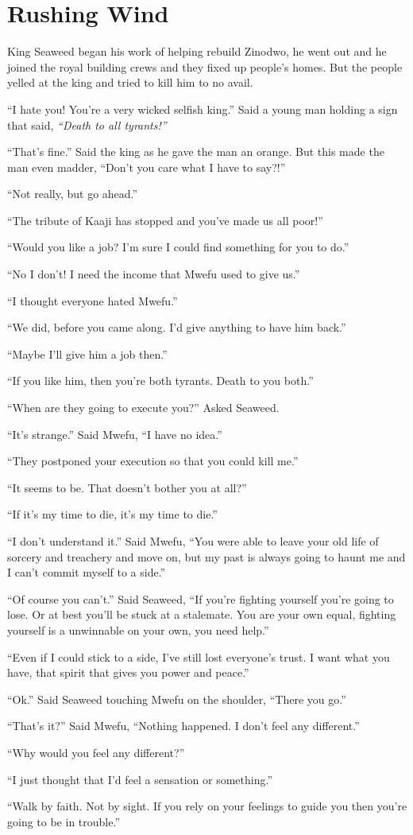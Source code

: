 \section{Rushing Wind}

King Seaweed began his work of helping rebuild Zinodwo, he went out and he joined the royal building crews and they fixed up people's homes. But the people yelled at the king and tried to kill him to no avail.

``I hate you! You're a very wicked selfish king.''
Said a young man holding a sign that said, \emph{``Death to all tyrants!''}

``That's fine.'' Said the king as he gave the man an orange. But this made the man even madder, ``Don't you care what I have to say?!''

``Not really, but go ahead.''

``The tribute of Kaaji has stopped and you've made us all poor!''

``Would you like a job? I'm sure I could find something for you to do.''

``No I don't! I need the income that Mwefu used to give us.''

``I thought everyone hated Mwefu.''

``We did, before you came along. I'd give anything to have him back.''

``Maybe I'll give him a job then.''

``If you like him, then you're both tyrants. Death to you both.''

\tbreak

``When are they going to execute you?'' Asked Seaweed.

``It's strange.'' Said Mwe\-fu, ``I have no idea.''

``They postponed your execution so that you could kill me.''

``It seems to be. That doesn't bother you at all?''

``If it's my time to die, it's my time to die.''

``I don't understand it.'' Said Mwe\-fu, ``You were able to leave your old life of sorcery and treachery and move on, but my past is always going to haunt me and I can't commit myself to a side.''

``Of course you can't.'' Said Seaweed, ``If you're fighting yourself you're going to lose. Or at best you'll be stuck at a stalemate. You are your own equal, fighting yourself is a unwinnable on your own, you need help.''

``Even if I could stick to a side, I've still lost everyone's trust. I want what you have, that spirit that gives you power and peace.''

``Ok.'' Said Seaweed touching Mwe\-fu on the shoulder, ``There you go.''

``That's it?'' Said Mwe\-fu, ``Nothing happened. I don't feel any different.''

``Why would you feel any different?''

``I just thought that I'd feel a sensation or something.''

``Walk by faith. Not by sight. If you rely on your feelings to guide you then you're going to be in trouble.''
